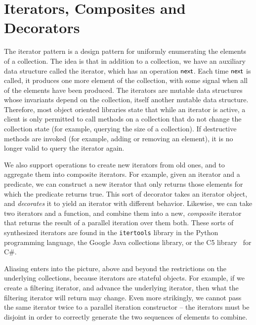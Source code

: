 
\section{Iterators, Composites and Decorators}

The iterator pattern is a design pattern for uniformly enumerating the
elements of a collection. The idea is that in addition to a
collection, we have an auxiliary data structure called the iterator,
which has an operation $\mathsf{next}$. Each time $\mathsf{next}$ is
called, it produces one more element of the collection, with some
signal when all of the elements have been produced. The iterators are
mutable data structures whose invariants depend on the collection,
itself another mutable data structure. Therefore, most object oriented
libraries state that while an iterator is active, a client is only
permitted to call methods on a collection that do not change the
collection state (for example, querying the size of a collection). If
destructive methods are invoked (for example, adding or removing an
element), it is no longer valid to query the iterator again.

We also support operations to create new iterators from old ones, and
to aggregate them into composite iterators. For example, given an
iterator and a predicate, we can construct a new iterator that only
returns those elements for which the predicate returns true. This sort
of decorator takes an iterator object, and \emph{decorates} it to
yield an iterator with different behavior. Likewise, we can take two
iterators and a function, and combine them into a new,
\emph{composite} iterator that returns the result of a parallel
iteration over them both.  These sorts of synthesized iterators are found
in the \texttt{itertools} library in the Python programming language,
the Google Java collections library, or the C5 library~\cite{C5} for
C\#.

Aliasing enters into the picture, above and beyond the restrictions on
the underlying collections, because iterators are stateful
objects. For example, if we create a filtering iterator, and advance
the underlying iterator, then what the filtering iterator will return
may change. Even more strikingly, we cannot pass the same iterator
twice to a parallel iteration constructor -- the iterators must be
disjoint in order to correctly generate the two sequences of elements
to combine.

